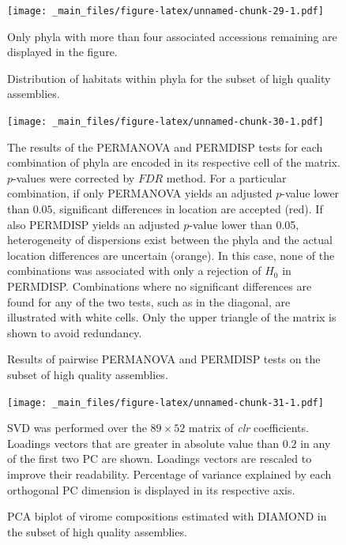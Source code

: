 \documentclass[
  openany]{book}
\begin{document}
\begin{figure}[!htbp]

\texttt{[image: \_main\_files/figure-latex/unnamed-chunk-29-1.pdf]}

\caption{Distribution of habitats within phyla for the subset of high quality assemblies.\label{fig:qualdiver}}
Only phyla with more than four associated accessions remaining are displayed in the figure.


\end{figure}

\begin{figure}[!htbp]

\texttt{[image: \_main\_files/figure-latex/unnamed-chunk-30-1.pdf]}

\caption{Results of pairwise PERMANOVA and PERMDISP tests on the subset of high quality assemblies.\label{fig:permmatrix}}
The results of the PERMANOVA and PERMDISP tests for each combination of phyla are encoded in its respective cell of the matrix. $p$-values were corrected by $FDR$ method. For a particular combination, if only PERMANOVA yields an adjusted $p$-value lower than $0.05$, significant differences in location are accepted (red). If also PERMDISP yields an adjusted $p$-value lower than 0.05, heterogeneity of dispersions exist between the phyla and the actual location differences are uncertain (orange). In this case, none of the combinations was associated with only a rejection of $H_0$ in PERMDISP. Combinations where no significant differences are found for any of the two tests, such as in the diagonal, are illustrated with white cells. Only the upper triangle of the matrix is shown to avoid redundancy.

\end{figure}

\begin{figure}[!htbp]

\texttt{[image: \_main\_files/figure-latex/unnamed-chunk-31-1.pdf]}

\caption{PCA biplot of virome compositions estimated with DIAMOND in the subset of high quality assemblies.\label{fig:pcaqual}}
SVD was performed over the $89 \times 52$ matrix of \emph{clr} coefficients. Loadings vectors that are greater in absolute value than $0.2$ in any of the first two PC are shown. Loadings vectors are rescaled to improve their readability. Percentage of variance explained by each orthogonal PC dimension is displayed in its respective axis.

\end{figure}

\printbibliography
\end{document}
